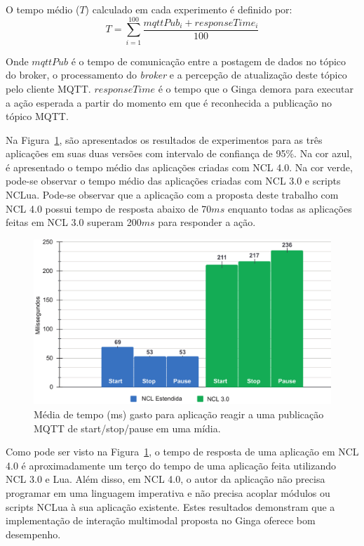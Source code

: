 O tempo médio ($T$) calculado em cada  experimento é definido por: 
\[ T = \sum_{i=1}^{100}{\frac{mqttPub_i+responseTime_i}{100}}\]

Onde $mqttPub$ é o tempo de comunicação entre a postagem de dados no tópico do broker, o processamento do \textit{broker} e a percepção de atualização deste tópico pelo cliente MQTT. $responseTime$ é o tempo que o Ginga demora para executar a ação esperada a partir do momento em que é reconhecida a publicação no tópico MQTT.

Na Figura~\ref{fig:grafAvaliacao}, são apresentados os resultados de experimentos para as três aplicações em suas duas versões com intervalo de confiança de 95\%. Na cor azul, é apresentado o tempo médio das aplicações criadas com NCL 4.0. Na cor verde, pode-se observar o tempo médio das aplicações criadas com NCL 3.0 e scripts NCLua. Pode-se observar que a aplicação com a proposta deste trabalho com NCL 4.0 possui tempo de resposta abaixo de 70$ms$ enquanto todas as aplicações feitas em NCL 3.0 superam 200$ms$ para responder a ação. 

\begin{figure}[h!]
    \centering
    \includegraphics[scale=0.5, keepaspectratio=true]{figuras/graficoAvaliacao1.pdf}
    \caption{Média de tempo (ms) gasto para aplicação reagir a uma publicação MQTT de start/stop/pause em uma mídia.}
    \label{fig:grafAvaliacao}
\end{figure}

Como pode ser visto na Figura~\ref{fig:grafAvaliacao}, o tempo de resposta de uma aplicação em NCL 4.0 é aproximadamente um terço do tempo de uma aplicação feita utilizando NCL 3.0 e Lua. Além disso, em NCL 4.0, o autor da aplicação não precisa programar em uma linguagem imperativa e não precisa acoplar módulos ou scripts NCLua à sua aplicação existente. Estes resultados demonstram que a implementação de interação multimodal proposta no Ginga oferece bom desempenho.

